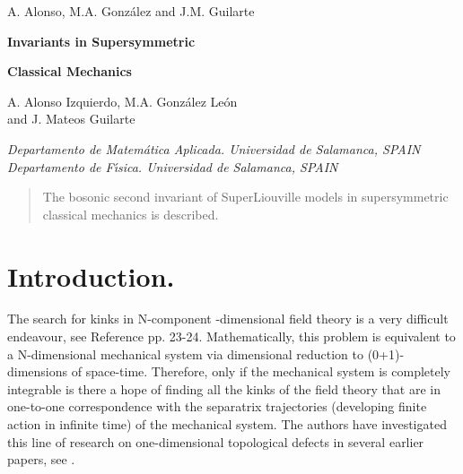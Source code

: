 \documentclass[a4paper,11pt,twoside]{article}
\begin{document}
\pagestyle{myheadings} 
{{\sc A. Alonso, M.A. Gonz\'alez and J.M. Guilarte }} \vspace{1cm}

%
%

\thispagestyle{empty}

\begin{center}

{\Large{\bf{Invariants in Supersymmetric}}}

\medskip

{\Large{\bf{Classical Mechanics}}}

\vskip1cm

{\sc A. Alonso Izquierdo\coordHE{}, M.A.
Gonz\'alez Le\'on\coordHE{}} \\
{\sc and J. Mateos Guilarte\coordHE{}}
\vskip0.5cm

{\it {}\coordHE{} Departamento de Matem\'atica Aplicada. Universidad de Salamanca, SPAIN}
\vskip0.3cm
{\it {}\coordHE{} Departamento de
F\'{\i}sica. Universidad de Salamanca, SPAIN   }
\end{center}
\bigskip

%
%

\begin{abstract}
The bosonic second invariant of SuperLiouville models in
supersymmetric classical mechanics is described.
\end{abstract}

\section{Introduction.}

The search for kinks in N-component \coordHE{}-dimensional field
theory is a very difficult endeavour, see Reference \cite{Raja}
pp. 23-24. Mathematically, this problem is equivalent to a
N-dimensional mechanical system via dimensional reduction to
(0+1)-dimensions of space-time. Therefore, only if the mechanical
system is completely integrable is there a hope of finding all the
kinks of the field theory that are in one-to-one correspondence
with the separatrix trajectories (developing finite action in
infinite time) of the mechanical system. The authors have
investigated this line of research on one-dimensional topological
defects in several earlier papers, see \cite{Pa1}.
\end{document}
